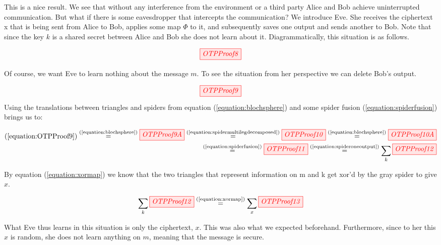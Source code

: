 \documentclass[]{article}
\newcommand{\equaltext}[1]{\ensuremath{\stackrel{\text{#1}}{=}}}
\begin{document}
This is a nice result. We see that without any interference from the environment or a third party Alice and Bob achieve uninterrupted communication. But what if there is some eavesdropper that intercepts the communication? We introduce Eve. She receives the ciphertext x that is being sent from Alice to Bob, applies some map $\Phi$ to it, and subsequently saves one output and sends another to Bob. Note that since the key $k$ is a shared secret between Alice and Bob she does not learn about it. Diagrammatically, this situation is as follows.

\begin{equation}
	\tikzfig{OTPProof8}
\end{equation}

Of course, we want Eve to learn nothing about the message $m$. To see the situation from her perspective we can delete Bob's output.

\begin{equation}
	\label{equation:OTPProof9}
	\tikzfig{OTPProof9}
\end{equation}
\newpage
Using the translations between triangles and spiders from equation (\ref{equation:blochsphere}) and some spider fusion (\ref{equation:spiderfusion}) brings us to:

\begin{equation}
\begin{split}
(\ref{equation:OTPProof9}) \equaltext{(\ref{equation:blochsphere})}
\tikzfig{OTPProof9A} \equaltext{(\ref{equation:spidermultilegdecomposed})} \tikzfig{OTPProof10} \equaltext{(\ref{equation:blochsphere})} \tikzfig{OTPProof10A} \\ \equaltext{(\ref{equation:spiderfusion})} \tikzfig{OTPProof11} \equaltext{(\ref{equation:spideroneoutput})} \sum\limits_{k} \tikzfig{OTPProof12}
\end{split}
\end{equation}

By equation (\ref{equation:xormap}) we know that the two triangles that represent information on m and k get xor'd by the gray spider to give $x$.

\begin{equation}
\sum\limits_{k} \tikzfig{OTPProof12} \equaltext{(\ref{equation:xormap})} \sum\limits_{x} \tikzfig{OTPProof13}
\end{equation}

What Eve thus learns in this situation is only the ciphertext, $x$. This was also what we expected beforehand. Furthermore, since to her this $x$ is random, she does not learn anything on $m$, meaning that the message is secure.
\end{document}
